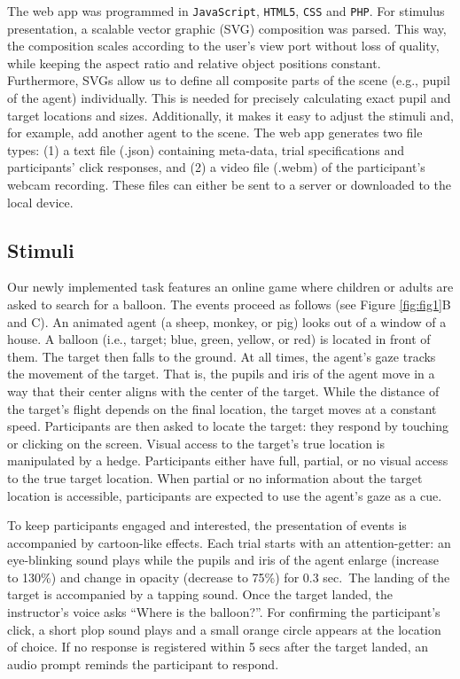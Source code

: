 \documentclass[
  man,floatsintext]{apa6}
\begin{document}
The web app was programmed in \texttt{JavaScript}, \texttt{HTML5}, \texttt{CSS} and \texttt{PHP}. For stimulus presentation, a scalable vector graphic (SVG) composition was parsed. This way, the composition scales according to the user's view port without loss of quality, while keeping the aspect ratio and relative object positions constant. Furthermore, SVGs allow us to define all composite parts of the scene (e.g., pupil of the agent) individually. This is needed for precisely calculating exact pupil and target locations and sizes. Additionally, it makes it easy to adjust the stimuli and, for example, add another agent to the scene. The web app generates two file types: (1) a text file (.json) containing meta-data, trial specifications and participants' click responses, and (2) a video file (.webm) of the participant's webcam recording. These files can either be sent to a server or downloaded to the local device.

\hypertarget{stimuli}{%
\subsection{Stimuli}\label{stimuli}}

Our newly implemented task features an online game where children or adults are asked to search for a balloon. The events proceed as follows (see Figure \ref{fig:fig1}B and C). An animated agent (a sheep, monkey, or pig) looks out of a window of a house. A balloon (i.e., target; blue, green, yellow, or red) is located in front of them. The target then falls to the ground. At all times, the agent's gaze tracks the movement of the target. That is, the pupils and iris of the agent move in a way that their center aligns with the center of the target. While the distance of the target's flight depends on the final location, the target moves at a constant speed. Participants are then asked to locate the target: they respond by touching or clicking on the screen. Visual access to the target's true location is manipulated by a hedge. Participants either have full, partial, or no visual access to the true target location. When partial or no information about the target location is accessible, participants are expected to use the agent's gaze as a cue.

To keep participants engaged and interested, the presentation of events is accompanied by cartoon-like effects. Each trial starts with an attention-getter: an eye-blinking sound plays while the pupils and iris of the agent enlarge (increase to 130\%) and change in opacity (decrease to 75\%) for 0.3 sec.~The landing of the target is accompanied by a tapping sound. Once the target landed, the instructor's voice asks ``Where is the balloon?''. For confirming the participant's click, a short plop sound plays and a small orange circle appears at the location of choice. If no response is registered within 5 secs after the target landed, an audio prompt reminds the participant to respond.
\end{document}
